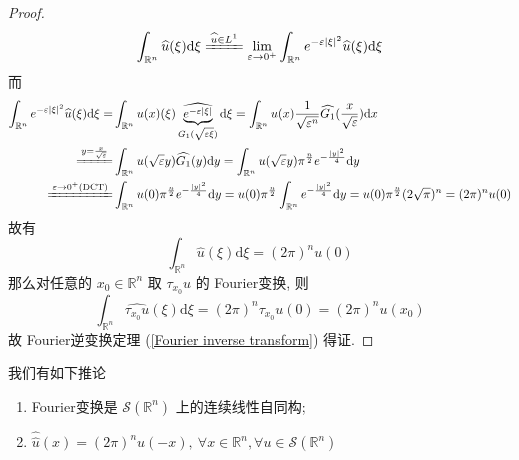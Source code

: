 \documentclass[11pt]{ctexart}[UTF8]
\begin{document}
\begin{proof}
\begin{equation*}
        \int_{\mathbb{R}^{n}} \widehat{u}(\xi) \mathrm{d}\xi \xlongequal{\widehat{u} \in L^{1}} \lim_{\varepsilon \to 0^{+}} \int_{\mathbb{R}^{n}} e^{-\varepsilon |\xi|^2} \widehat{u}(\xi) \mathrm{d}\xi 
    \end{equation*}
    而
    \begin{equation*}
        \begin{aligned}
            \int_{\mathbb{R}^{n}} e^{-\varepsilon |\xi|^2} \widehat{u}(\xi) \mathrm{d}\xi = & \int_{\mathbb{R}^{n}}u(x)(\xi)\underbrace{\widehat{e^{-\varepsilon|\xi|}}}_{G_{1}(\sqrt{\varepsilon\xi})} \mathrm{d}\xi = \int_{\mathbb{R}^{n}} u(x) \frac{1}{\sqrt{\varepsilon^{n}}}\widehat{G_{1}}(\frac{x}{\sqrt{\varepsilon}}) \mathrm{d}x \\
            \xlongequal{y = \frac{x}{\sqrt{\varepsilon}}} & \int_{\mathbb{R}^{n}} u(\sqrt{\varepsilon}y) \widehat{G_{1}}(y) \mathrm{d}y = \int_{\mathbb{R}^{n}} u(\sqrt{\varepsilon}y) \pi^{\frac{n}{2}} e^{-\frac{|y|^2}{4}} \mathrm{d}y \\
            \xlongequal{\varepsilon \to 0^+(\mathrm{DCT})} & \int_{\mathbb{R}^n} u(0)\pi^{\frac{n}{2}}  e^{-\frac{|y|^2}{4}} \mathrm{d}y = u(0) \pi^{\frac{n}{2}} \int_{\mathbb{R}^n} e^{-\frac{|y|^2}{4}} \mathrm{d}y = u(0) \pi^{\frac{n}{2}} (2\sqrt{\pi})^n = (2\pi)^n u(0)
        \end{aligned}
    \end{equation*}
    故有
    \begin{equation*}
        \int_{\mathbb{R}^{n}} \widehat{u}(\xi) \mathrm{d}\xi = (2\pi)^n u(0)
    \end{equation*}
    那么对任意的 $x_{0} \in \mathbb{R}^n$ 取 $\tau_{x_0}u$ 的 Fourier变换, 则
    \begin{equation*}
        \int_{\mathbb{R}^{n}} \widehat{\tau_{x_{0}}u}(\xi) \mathrm{d}\xi = (2\pi)^n \tau_{x_0}u(0) = (2\pi)^n u(x_0)
    \end{equation*}
    故 Fourier逆变换定理 (\ref{Fourier inverse transform}) 得证.
\end{proof}
我们有如下推论
\begin{corollary}\leavevmode
    \begin{enumerate}
        \item Fourier变换是 $\mathscr{S}(\mathbb{R}^{n})$ 上的连续线性自同构;
        \item $\widehat{\widehat{u}}(x) = (2\pi)^{n} u(-x),\ \forall x \in \mathbb{R}^n, \forall u \in \mathscr{S}(\mathbb{R}^{n})$
    \end{enumerate}
    
\end{corollary}
\end{document}
